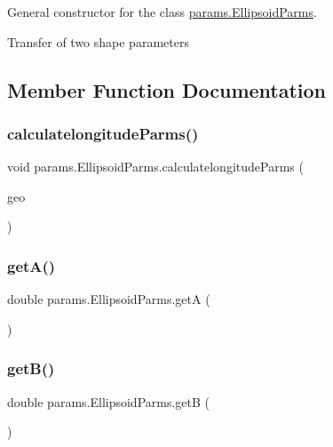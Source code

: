 General constructor for the class \hyperlink{classparams_1_1_ellipsoid_parms}{params.\+Ellipsoid\+Parms}. 

Transfer of two shape parameters 

\subsection{Member Function Documentation}
\mbox{\label{classparams_1_1_ellipsoid_parms_ad33cde2be306e100c10b186416864d36}} 
\subsubsection{\texorpdfstring{calculatelongitude\+Parms()}{calculatelongitudeParms()}}
{\footnotesize\ttfamily void params.\+Ellipsoid\+Parms.\+calculatelongitude\+Parms (\begin{DoxyParamCaption}\item[{\hyperlink{classcoordinates_1_1_geographic_coordinate_interface}{Geographic\+Coordinate\+Interface}}]{geo }\end{DoxyParamCaption})}

\mbox{\label{classparams_1_1_ellipsoid_parms_ae03d19a0d3978b7a415889bbb6029507}} 
\subsubsection{\texorpdfstring{get\+A()}{getA()}}
{\footnotesize\ttfamily double params.\+Ellipsoid\+Parms.\+getA (\begin{DoxyParamCaption}{ }\end{DoxyParamCaption})}

\mbox{\label{classparams_1_1_ellipsoid_parms_aa770f799319db188ff9f424e9b099859}} 
\subsubsection{\texorpdfstring{get\+B()}{getB()}}
{\footnotesize\ttfamily double params.\+Ellipsoid\+Parms.\+getB (\begin{DoxyParamCaption}{ }\end{DoxyParamCaption})}

